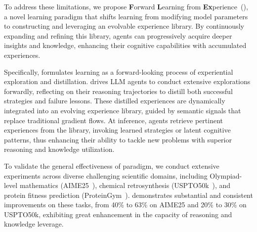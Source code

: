 To address these limitations, we propose \textbf{F}orward \textbf{L}earning from \textbf{Ex}perience~(\textbf{\method{}}), a novel learning paradigm that shifts learning from modifying model parameters to constructing and leveraging an evolvable experience library.
By continuously expanding and refining this library, agents can progressively acquire deeper insights and knowledge, enhancing their cognitive capabilities with accumulated experiences.

Specifically, \method{} formulates learning as a forward-looking process of experiential exploration and distillation.
\method{} drives LLM agents to conduct extensive explorations forwardly, reflecting on their reasoning trajectories to distill both successful strategies and failure lessons. These distilled experiences are dynamically integrated into an evolving experience library, guided by semantic signals that replace traditional gradient flows. 
At inference, agents retrieve pertinent experiences from the library, invoking learned strategies or latent cognitive patterns, thus enhancing their ability to tackle new problems with superior reasoning and knowledge utilization.


To validate the general effectiveness of \method{} paradigm, we conduct extensive experiments across diverse challenging scientific domains, including Olympiad-level mathematics (AIME25~\cite{aime2025problems}), chemical retrosynthesis (USPTO50k~\cite{schneider2016s}), and protein fitness prediction (ProteinGym~\cite{notin2023proteingym}). \method{} demonstrates substantial and consistent improvements on these tasks, from 40\% to 63\% on AIME25 and 20\% to 30\% on USPTO50k, exhibiting great enhancement in the capacity of reasoning and knowledge leverage.

